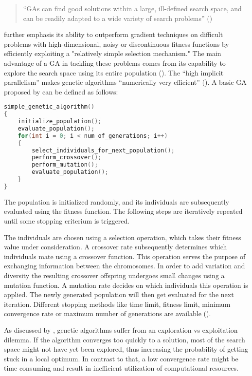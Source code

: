 \begin{quote}
	\begin{em}
		\enquote{GAs can find good solutions within a large, ill-defined search space, and can be readily adapted to a wide variety of search problems} (\cite{mills_determining_2015})
	\end{em}
\end{quote}

\cite{grefenstette_optimization_1986} further emphasis its ability to outperform gradient techniques on difficult problems with high-dimensional, noisy or discontinuous fitness functions by efficiently exploiting a "relatively simple selection mechanism." The main advantage of a GA in tackling these problems comes from its capability to explore the search space using its entire population (\cite{hussain_trade-off_2020}). The \enquote{high implicit parallelism} makes genetic algorithms \enquote{numerically very efficient} (\cite{marsili_libelli_adaptive_2000}). A basic GA proposed by \cite{holland_adaptation_1992} can be defined as follows:

\begin{lstlisting}[language=C, tabsize=4]
simple_genetic_algorithm() 
{
	initialize_population();
	evaluate_population();
	for(int i = 0; i < num_of_generations; i++) 
	{
		select_individuals_for_next_population();
		perform_crossover();
		perform_mutation();
		evaluate_population();
	}
}
\end{lstlisting}

The population is initialized randomly, and its individuals are subsequently evaluated using the fitness function. The following steps are iteratively repeated until some stopping criterium is triggered. 

The individuals are chosen using a selection operation, which takes their fitness value under consideration. A crossover rate subsequently determines which individuals mate using a crossover function. This operation serves the purpose of exchanging information between the chromosomes. In order to add variation and diversity the resulting crossover offspring undergoes small changes using a mutation function. A mutation rate decides on which individuals this operation is applied. The newly generated population will then get evaluated for the next iteration. Different stopping methods like time limit, fitness limit, minimum convergence rate or maximum number of generations are available (\cite{majumdar_genetic_2015}).

As discussed by \cite{hussain_trade-off_2020}, genetic algorithms suffer from an exploration vs exploitation dilemma. If the algorithm converges too quickly to a solution, most of the search space might not have yet been explored, thus increasing the probability of getting stuck in a local optimum.
In contrast to that, a low convergence rate might be time consuming and result in inefficient utilization of computational resources.

